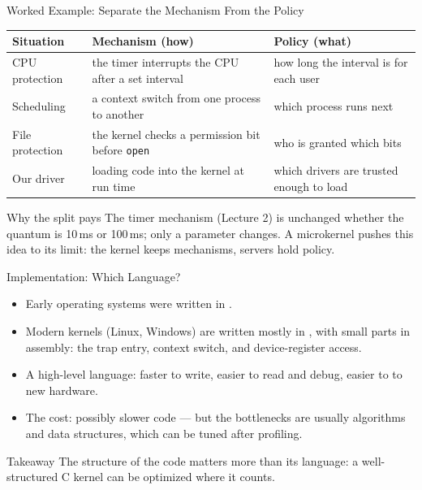 \documentclass[aspectratio=169]{beamer}
\begin{document}
\begin{frame}{Worked Example: Separate the Mechanism From the Policy}
  \footnotesize
  \renewcommand{\arraystretch}{1.3}
  \centering
  \begin{tabular}{p{}p{}p{}}
    \textbf{Situation} & \textbf{Mechanism (how)} & \textbf{Policy (what)} \\
    \hline
    CPU protection & the timer interrupts the CPU after a set interval
      & how long the interval is for each user \\
    Scheduling & a context switch from one process to another
      & which process runs next \\
    File protection & the kernel checks a permission bit before \texttt{open}
      & who is granted which bits \\
    Our driver & loading code into the kernel at run time
      & which drivers are trusted enough to load \\
  \end{tabular}
  \vspace{0.25cm}
  \begin{exampleblock}{Why the split pays}
    The timer mechanism (Lecture 2) is unchanged whether the quantum is 10\,ms or
    100\,ms; only a parameter changes. A microkernel pushes this idea to its
    limit: the kernel keeps mechanisms, servers hold policy.
  \end{exampleblock}
\end{frame}

\begin{frame}{Implementation: Which Language?}
  \begin{itemize}
    \item Early operating systems were written in .
    \item Modern kernels (Linux, Windows) are written mostly in , with
      small parts in assembly: the trap entry, context switch, and
      device-register access.
    \item A high-level language: faster to write, easier to read and debug,
      easier to  to new hardware.
    \item The cost: possibly slower code --- but the bottlenecks are usually
      algorithms and data structures, which can be tuned after profiling.
  \end{itemize}
  \vspace{0.2cm}
  \begin{alertblock}{Takeaway}
    The structure of the code matters more than its language: a
    well-structured C kernel can be optimized where it counts.
  \end{alertblock}
\end{frame}
\end{document}
